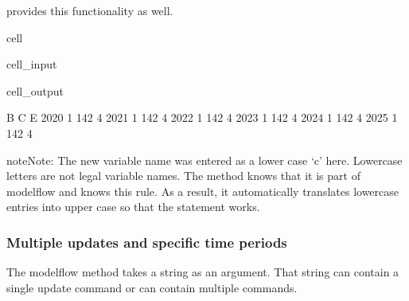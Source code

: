 \documentclass[letterpaper,10pt,english]{jupyterBook}
\begin{document}
\sphinxAtStartPar
{}

\sphinxAtStartPar
{} provides this functionality as well.

\begin{sphinxuseclass}{cell}\begin{sphinxVerbatimInput}

\begin{sphinxuseclass}{cell_input}
\begin{sphinxVerbatim}[commandchars=\\\{\}]
\end{sphinxVerbatim}

\end{sphinxuseclass}\end{sphinxVerbatimInput}
\begin{sphinxVerbatimOutput}

\begin{sphinxuseclass}{cell_output}
\begin{sphinxVerbatim}[commandchars=\\\{\}]
      B    C  E
2020  1  142  4
2021  1  142  4
2022  1  142  4
2023  1  142  4
2024  1  142  4
2025  1  142  4
\end{sphinxVerbatim}

\end{sphinxuseclass}\end{sphinxVerbatimOutput}

\end{sphinxuseclass}
\begin{sphinxadmonition}{note}{Note:}
\sphinxAtStartPar
The new variable name was entered as a lower case ‘c’ here.  Lowercase letters are not legal  variable names.  The  method knows that it is part of modelflow and knows this rule. As a result, it automatically translates lowercase entries into upper case so that the statement works.
\end{sphinxadmonition}


\subsubsection{Multiple updates and specific time periods}
\label{\detokenize{content/04_PythonEssentials/UpdateCommand:multiple-updates-and-specific-time-periods}}
\sphinxAtStartPar
The modelflow method  takes a string as an argument.  That string can contain a single update command or can contain multiple commands.
\end{document}
